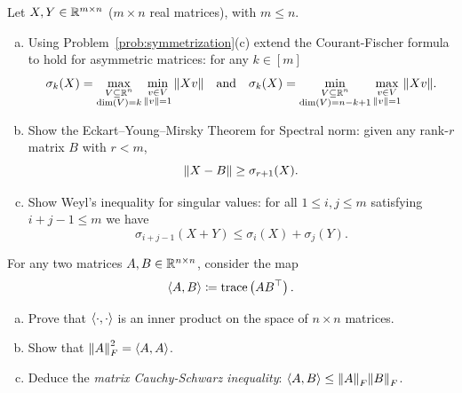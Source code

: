 \begin{myexercise}\label{prob:courant_fischer_consequences}
    Let $X, Y \in \mathbb{R}^{m \times n}$ ($m \times n$ real matrices), with $m \leq n$.
    \begin{enumerate}[(a)]
        \item Using Problem~\ref{prob:symmetrization}(c) extend the Courant-Fischer formula to hold for asymmetric matrices: for any $k \in [m]$
        \begin{equation*}
            \sigma_k(X) = \max_{\substack{V \subseteq \mathbb{R}^n\\ \dim(V) = k}} \min_{\substack{v \in V\\ {\left\lVert{v}\right\rVert} = 1}} {\left\lVert{X v}\right\rVert}
            \quad\text{and}\quad            
            \sigma_k(X) = \min_{\substack{V \subseteq \mathbb{R}^n\\ \dim(V) = n-k+1}} \max_{\substack{v \in V\\ {\left\lVert{v}\right\rVert} = 1}} {\left\lVert{X v}\right\rVert}.
        \end{equation*}
        
        \item Show the Eckart–Young–Mirsky Theorem for Spectral norm: given any rank-$r$ matrix $B$ with $r < m$,
        \begin{equation*}
            {\left\lVert{X-B}\right\rVert} \geq \sigma_{r+1}(X).
        \end{equation*}

        \item Show Weyl's inequality for singular values: for all $1 \leq i, j \leq m$ satisfying $i+j-1 \leq m$ we have
        \begin{equation*}
            \sigma_{i+j-1}(X+Y) \leq \sigma_i(X) + \sigma_j(Y).
        \end{equation*}
    \end{enumerate}
\end{myexercise}

\begin{myexercise}\label{prob:matrix_inner_product}
    For any two matrices $A, B \in \mathbb{R}^{n \times n}$, consider the map
    \begin{equation*}
        \left\langle A, B \right\rangle \coloneqq \operatorname{trace}\left( A B^\top \right).
    \end{equation*}
    \begin{enumerate}[(a)]
        \item Prove that $\left\langle \cdot, \cdot \right\rangle$ is an inner product on the space of $n \times n$ matrices.

        \item Show that ${\left\lVert{A}\right\rVert}_F^2 = \left\langle A, A \right\rangle$.

        \item Deduce the \textit{matrix Cauchy-Schwarz inequality}: $\left\langle A, B \right\rangle \leq {\left\lVert{A}\right\rVert}_F {\left\lVert{B}\right\rVert}_F$.
    \end{enumerate}
\end{myexercise}

